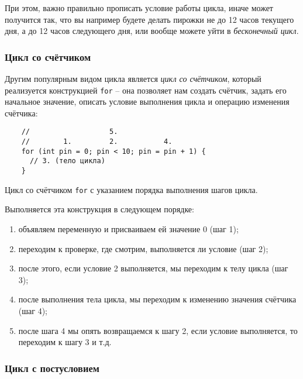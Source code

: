 \documentclass[../sparc.tex]{subfiles}
\begin{document}
При этом, важно правильно прописать условие работы цикла, иначе может получится
так, что вы например будете делать пирожки не до 12 часов текущего дня, а до 12
часов следующего дня, или вообще можете уйти в \emph{бесконечный цикл}.

\subsubsection{Цикл со счётчиком}

Другим популярным видом цикла является \emph{цикл со счётчиком}, который
реализуется конструкцией \texttt{for} -- она позволяет нам создать счётчик,
задать его начальное значение, описать условие выполнения цикла и операцию
изменения счётчика:

\begin{listing}[ht]
  \begin{verbatim}
    //                   5.
    //        1.         2.           4.
    for (int pin = 0; pin < 10; pin = pin + 1) {
      // 3. (тело цикла)
    }
  \end{verbatim}
  \label{listing:dialogues-with-computer-for}
  \caption{Цикл со счётчиком \texttt{for} с указанием порядка выполнения шагов
    цикла.}
\end{listing}

Выполняется эта конструкция в следующем порядке:
\begin{enumerate}
\item объявляем переменную и присваиваем ей значение 0 (шаг 1);
\item переходим к проверке, где смотрим, выполняется ли условие (шаг 2);
\item после этого, если условие 2 выполняется, мы переходим к телу цикла (шаг 3);
\item после выполнения тела цикла, мы переходим к изменению значения счётчика (шаг 4);
\item после шага 4 мы опять возвращаемся к шагу 2, если условие выполняется, то
  переходим к шагу 3 и т.д.
\end{enumerate}

\subsubsection{Цикл с постусловием}
\end{document}
